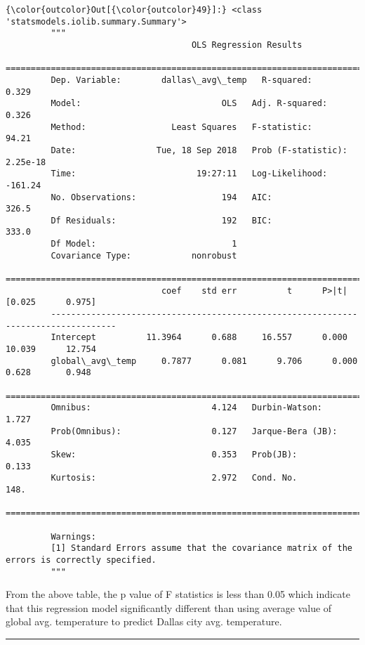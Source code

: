 \documentclass[11pt]{article}
\begin{document}
\begin{Verbatim}[commandchars=\\\{\}]
{\color{outcolor}Out[{\color{outcolor}49}]:} <class 'statsmodels.iolib.summary.Summary'>
         """
                                     OLS Regression Results                            
         ==============================================================================
         Dep. Variable:        dallas\_avg\_temp   R-squared:                       0.329
         Model:                            OLS   Adj. R-squared:                  0.326
         Method:                 Least Squares   F-statistic:                     94.21
         Date:                Tue, 18 Sep 2018   Prob (F-statistic):           2.25e-18
         Time:                        19:27:11   Log-Likelihood:                -161.24
         No. Observations:                 194   AIC:                             326.5
         Df Residuals:                     192   BIC:                             333.0
         Df Model:                           1                                         
         Covariance Type:            nonrobust                                         
         ===================================================================================
                               coef    std err          t      P>|t|      [0.025      0.975]
         -----------------------------------------------------------------------------------
         Intercept          11.3964      0.688     16.557      0.000      10.039      12.754
         global\_avg\_temp     0.7877      0.081      9.706      0.000       0.628       0.948
         ==============================================================================
         Omnibus:                        4.124   Durbin-Watson:                   1.727
         Prob(Omnibus):                  0.127   Jarque-Bera (JB):                4.035
         Skew:                           0.353   Prob(JB):                        0.133
         Kurtosis:                       2.972   Cond. No.                         148.
         ==============================================================================
         
         Warnings:
         [1] Standard Errors assume that the covariance matrix of the errors is correctly specified.
         """
\end{Verbatim}
            
    From the above table, the p value of F statistics is less than 0.05
which indicate that this regression model significantly different than
using average value of global avg. temperature to predict Dallas city
avg. temperature.

    \begin{center}\rule{0.5\linewidth}{\linethickness}\end{center}


    
    
    
    
\end{document}
